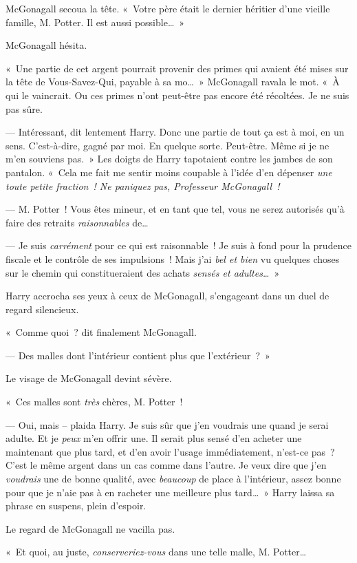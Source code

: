 McGonagall secoua la tête. «~Votre père était le dernier héritier d'une vieille famille, M. Potter. Il est aussi possible…~»

McGonagall hésita.

«~Une partie de cet argent pourrait provenir des primes qui avaient été mises sur la tête de Vous-Savez-Qui, payable à sa mo…~» McGonagall ravala le mot. «~À qui le vaincrait. Ou ces primes n'ont peut-être pas encore été récoltées. Je ne suis pas sûre.

--- Intéressant, dit lentement Harry. Donc une partie de tout ça est à moi, en un sens. C'est-à-dire, gagné par moi. En quelque sorte. Peut-être. Même si je ne m'en souviens pas.~» Les doigts de Harry tapotaient contre les jambes de son pantalon. «~Cela me fait me sentir moins coupable à l'idée d'en dépenser \emph{une toute petite fraction~! Ne paniquez pas, Professeur McGonagall~!}

--- M. Potter~! Vous êtes mineur, et en tant que tel, vous ne serez autorisés qu'à faire des retraits \emph{raisonnables} de…

--- Je suis \emph{carrément} pour ce qui est raisonnable~! Je suis à fond pour la prudence fiscale et le contrôle de ses impulsions~! Mais j'ai \emph{bel et bien} vu quelques choses sur le chemin qui constitueraient des achats \emph{sensés et adultes…}~»

Harry accrocha ses yeux à ceux de McGonagall, s'engageant dans un duel de regard silencieux.

«~Comme quoi~? dit finalement McGonagall.

--- Des malles dont l'intérieur contient plus que l'extérieur~?~»

Le visage de McGonagall devint sévère.

«~Ces malles sont \emph{très} chères, M. Potter~!

--- Oui, mais -- plaida Harry. Je suis sûr que j'en voudrais une quand je serai adulte. Et je \emph{peux} m'en offrir une. Il serait plus sensé d'en acheter une maintenant que plus tard, et d'en avoir l'usage immédiatement, n'est-ce pas~? C'est le même argent dans un cas comme dans l'autre. Je veux dire que j'en \emph{voudrais} une de bonne qualité, avec \emph{beaucoup} de place à l'intérieur, assez bonne pour que je n'aie pas à en racheter une meilleure plus tard…~» Harry laissa sa phrase en suspens, plein d'espoir.

Le regard de McGonagall ne vacilla pas.

«~Et quoi, au juste, \emph{conserveriez-vous} dans une telle malle, M. Potter…

